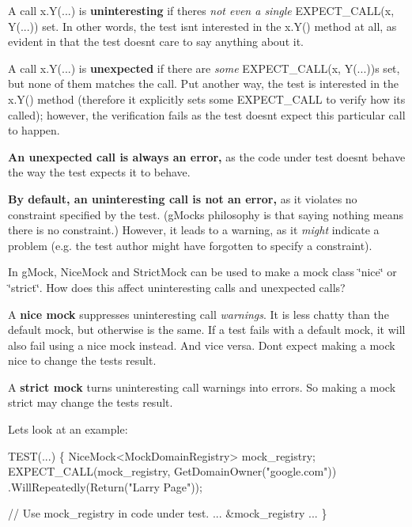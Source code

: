 A call {\ttfamily x.\+Y(...)} is {\bfseries uninteresting} if there\textquotesingle{}s {\itshape not even a single} {\ttfamily E\+X\+P\+E\+C\+T\+\_\+\+C\+A\+LL(x, Y(...))} set. In other words, the test isn\textquotesingle{}t interested in the {\ttfamily x.\+Y()} method at all, as evident in that the test doesn\textquotesingle{}t care to say anything about it.

A call {\ttfamily x.\+Y(...)} is {\bfseries unexpected} if there are {\itshape some} {\ttfamily E\+X\+P\+E\+C\+T\+\_\+\+C\+A\+LL(x, Y(...))}s set, but none of them matches the call. Put another way, the test is interested in the {\ttfamily x.\+Y()} method (therefore it explicitly sets some {\ttfamily E\+X\+P\+E\+C\+T\+\_\+\+C\+A\+LL} to verify how it\textquotesingle{}s called); however, the verification fails as the test doesn\textquotesingle{}t expect this particular call to happen.

{\bfseries An unexpected call is always an error,} as the code under test doesn\textquotesingle{}t behave the way the test expects it to behave.

{\bfseries By default, an uninteresting call is not an error,} as it violates no constraint specified by the test. (g\+Mock\textquotesingle{}s philosophy is that saying nothing means there is no constraint.) However, it leads to a warning, as it {\itshape might} indicate a problem (e.\+g. the test author might have forgotten to specify a constraint).

In g\+Mock, {\ttfamily Nice\+Mock} and {\ttfamily Strict\+Mock} can be used to make a mock class \char`\"{}nice\char`\"{} or \char`\"{}strict\char`\"{}. How does this affect uninteresting calls and unexpected calls?

A {\bfseries nice mock} suppresses uninteresting call {\itshape warnings}. It is less chatty than the default mock, but otherwise is the same. If a test fails with a default mock, it will also fail using a nice mock instead. And vice versa. Don\textquotesingle{}t expect making a mock nice to change the test\textquotesingle{}s result.

A {\bfseries strict mock} turns uninteresting call warnings into errors. So making a mock strict may change the test\textquotesingle{}s result.

Let\textquotesingle{}s look at an example\+:


\begin{DoxyCode}
TEST(...) \{
  NiceMock<MockDomainRegistry> mock\_registry;
  EXPECT\_CALL(mock\_registry, GetDomainOwner(\textcolor{stringliteral}{"google.com"}))
          .WillRepeatedly(Return(\textcolor{stringliteral}{"Larry Page"}));

  \textcolor{comment}{// Use mock\_registry in code under test.}
  ... &mock\_registry ...
\}
\end{DoxyCode}


